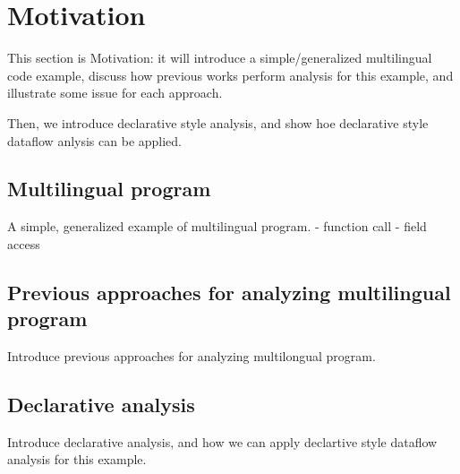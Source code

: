 \section{Motivation}
This section is Motivation:
it will introduce a simple/generalized multilingual code example,
discuss how previous works perform analysis for this example,
and illustrate some issue for each approach.

Then, we introduce declarative style analysis,
and show hoe declarative style dataflow anlysis can be applied.

\subsection{Multilingual program}
A simple, generalized example of multilingual program.
- function call
- field access

\subsection{Previous approaches for analyzing multilingual program}
Introduce previous approaches for analyzing multilongual program.

\subsection{Declarative analysis}
Introduce declarative analysis, and how we can apply declartive style dataflow analysis
for this example.
